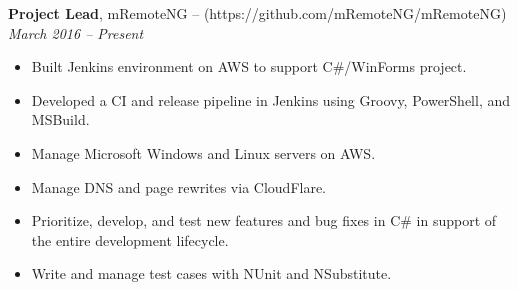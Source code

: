 {\bf Project Lead}, mRemoteNG -- (https://github.com/mRemoteNG/mRemoteNG)\\
{\it March 2016 – Present}
\begin{itemize}
	\item Built Jenkins environment on AWS to support C\#/WinForms project.
	\item Developed a CI and release pipeline in Jenkins using Groovy, PowerShell, and MSBuild.
	\item Manage Microsoft Windows and Linux servers on AWS.
	\item Manage DNS and page rewrites via CloudFlare.
	\item Prioritize, develop, and test new features and bug fixes in C\# in support of the entire development lifecycle.
	\item Write and manage test cases with NUnit and NSubstitute.
\end{itemize}